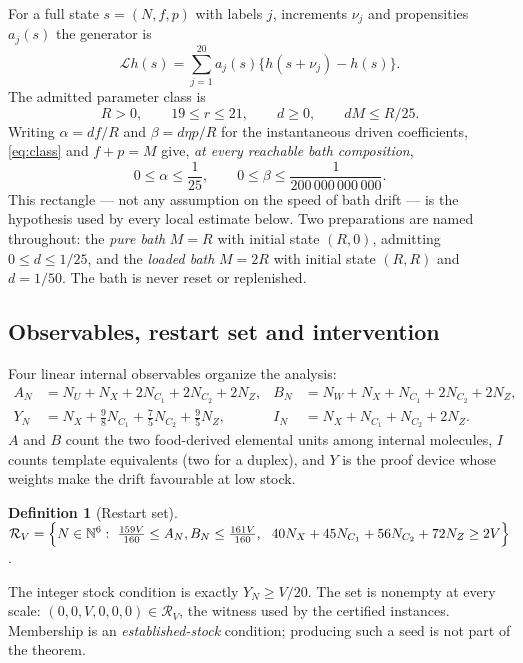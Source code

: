 \documentclass[11pt,a4paper]{article}
\theoremstyle{plain}
\theoremstyle{definition}
\newtheorem{definition}[theorem]{Definition}
\theoremstyle{remark}
\newcommand{\N}{\mathbb N}
\newcommand{\cR}{\mathcal R}
\newcommand{\Lgen}{\mathcal L}
\newcommand{\Iv}{I}
\begin{document}
For a full state $s=(N,f,p)$ with labels $j$, increments $\nu_j$ and propensities $a_j(s)$ the generator is
\begin{equation}\label{eq:generator}
\Lgen h(s)=\sum_{j=1}^{20}a_j(s)\bigl\{h(s+\nu_j)-h(s)\bigr\}.
\end{equation}
The admitted parameter class is
\begin{equation}\label{eq:class}
R>0,\qquad 19\le r\le21,\qquad d\ge0,\qquad dM\le R/25 .
\end{equation}
Writing $\alpha=df/R$ and $\beta=d\eta p/R$ for the instantaneous driven coefficients, \eqref{eq:class} and $f+p=M$ give, \emph{at every reachable bath composition},
\begin{equation}\label{eq:ratebox}
0\le\alpha\le\frac1{25},\qquad 0\le\beta\le\frac1{200\,000\,000\,000}.
\end{equation}
This rectangle --- not any assumption on the speed of bath drift --- is the hypothesis used by every local estimate below. Two preparations are named throughout: the \emph{pure bath} $M=R$ with initial state $(R,0)$, admitting $0\le d\le1/25$, and the \emph{loaded bath} $M=2R$ with initial state $(R,R)$ and $d=1/50$. The bath is never reset or replenished.

\subsection{Observables, restart set and intervention}\label{sec:observables}

Four linear internal observables organize the analysis:
\begin{equation}\label{eq:observables}
\begin{aligned}
A_N&=N_U+N_X+2N_{C_1}+2N_{C_2}+2N_Z, & B_N&=N_W+N_X+N_{C_1}+2N_{C_2}+2N_Z,\\
Y_N&=N_X+\tfrac98N_{C_1}+\tfrac75N_{C_2}+\tfrac95N_Z, & \Iv_N&=N_X+N_{C_1}+N_{C_2}+2N_Z.
\end{aligned}
\end{equation}
$A$ and $B$ count the two food-derived elemental units among internal molecules, $\Iv$ counts template equivalents (two for a duplex), and $Y$ is the proof device whose weights make the drift favourable at low stock.

\begin{definition}[Restart set]\label{def:restart}
$\displaystyle\cR_V=\Bigl\{N\in\N^6:\ \tfrac{159V}{160}\le A_N,B_N\le\tfrac{161V}{160},\ \ 40N_X+45N_{C_1}+56N_{C_2}+72N_Z\ge2V\Bigr\}$.
\end{definition}
The integer stock condition is exactly $Y_N\ge V/20$. The set is nonempty at every scale: $(0,0,V,0,0,0)\in\cR_V$, the witness used by the certified instances. Membership is an \emph{established-stock} condition; producing such a seed is not part of the theorem.
\end{document}
